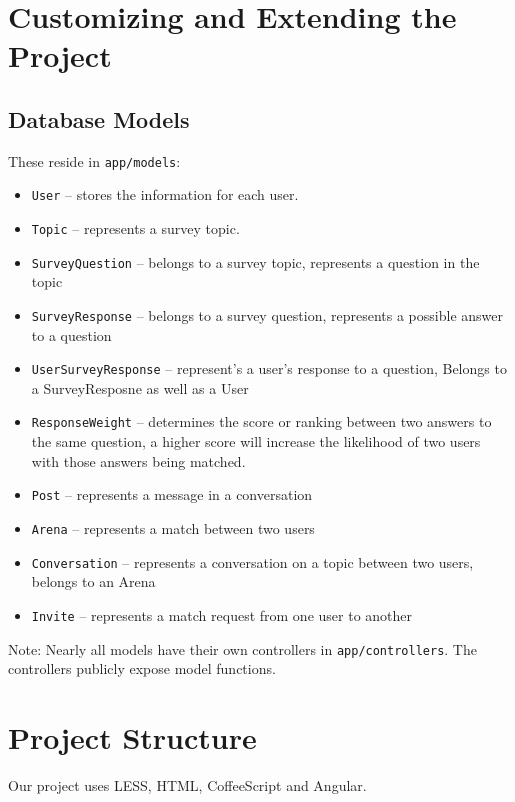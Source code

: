 \documentclass[12pt]{article}
\begin{document}
\section{Customizing and Extending the Project}

\subsection{Database Models}
These reside in \texttt{app/models}:
\begin{itemize}
    \item \texttt{User} -- stores the information for each user.
    \item \texttt{Topic} -- represents a survey topic.
    \item \texttt{SurveyQuestion} -- belongs to a survey topic, represents a question in the topic
    \item \texttt{SurveyResponse} -- belongs to a survey question, represents a possible answer to a question
    \item \texttt{UserSurveyResponse} -- represent’s a user’s response to a question, Belongs to a SurveyResposne as well as a User
    \item \texttt{ResponseWeight} -- determines the score or ranking between two answers to the same question, a higher score will increase the likelihood of two users with those answers being matched.
    \item \texttt{Post} -- represents a message in a conversation
    \item \texttt{Arena} -- represents a match between two users
    \item \texttt{Conversation} -- represents a conversation on a topic between two users, belongs to an Arena
    \item \texttt{Invite} -- represents a match request from one user to another
\end{itemize}

Note: Nearly all models have their own controllers in \texttt{app/controllers}.
The controllers publicly expose model functions.

\section{Project Structure}
Our project uses LESS, HTML, CoffeeScript and Angular.
\end{document}
